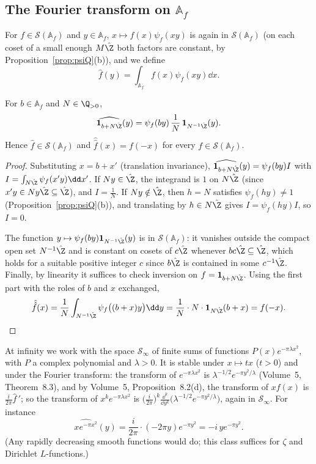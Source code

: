 \subsection*{The Fourier transform on \texorpdfstring{$\mathbb{A}_f$}{A\_f}}

For $f\in\mathcal S(\mathbb{A}_f)$ and $y\in\mathbb{A}_f$, $x\mapsto f(x)\psi_f(xy)$ is again in $\mathcal S(\mathbb{A}_f)$ (on each coset of a small enough $M\hat{\Z}$
both factors are constant, by Proposition~\ref{prop:psiQ}(b)), and we define
\[
\hat f(y)=\int_{\mathbb{A}_f}f(x)\psi_f(xy)\dd x.
\]

\begin{proposition}\label{prop:FTAf}
For $b\in\mathbb{A}_f$ and $N\in\Q_{>0}$,
\[
\widehat{\mathbf 1_{b+N\hat{\Z}}}(y)=\psi_f(by)\,\frac1N\,\mathbf 1_{N^{-1}\hat{\Z}}(y).
\]
Hence $\hat f\in\mathcal S(\mathbb{A}_f)$ and $\hat{\hat f}(x)=f(-x)$ for every $f\in\mathcal S(\mathbb{A}_f)$.
\end{proposition}
\begin{proof}
Substituting $x=b+x'$ (translation invariance), $\widehat{\mathbf 1_{b+N\hat{\Z}}}(y)=\psi_f(by)I$ with $I=\int_{N\hat{\Z}}\psi_f(x'y)\dd x'$. If
$Ny\in\hat{\Z}$, the integrand is $1$ on $N\hat{\Z}$ (since $x'y\in Ny\hat{\Z}\subseteq\hat{\Z}$), and $I=\frac1N$. If $Ny\notin\hat{\Z}$, then
$h=N$ satisfies $\psi_f(hy)\ne1$ (Proposition~\ref{prop:psiQ}(b)), and translating by $h\in N\hat{\Z}$ gives $I=\psi_f(hy)I$, so $I=0$.

The function $y\mapsto\psi_f(by)\mathbf 1_{N^{-1}\hat{\Z}}(y)$ is in $\mathcal S(\mathbb{A}_f)$: it vanishes outside the compact open set $N^{-1}\hat{\Z}$
and is constant on cosets of $c\hat{\Z}$ whenever $bc\hat{\Z}\subseteq\hat{\Z}$, which holds for a suitable positive integer $c$ since $b\hat{\Z}$ is
contained in some $c^{-1}\hat{\Z}$. Finally, by linearity it suffices to check inversion on $f=\mathbf 1_{b+N\hat{\Z}}$. Using the first part
with the roles of $b$ and $x$ exchanged,
\[
\hat{\hat f}(x)=\frac1N\int_{N^{-1}\hat{\Z}}\psi_f\bigl((b+x)y\bigr)\dd y=\frac1N\cdot N\cdot\mathbf 1_{N\hat{\Z}}(b+x)=f(-x).
\]
\end{proof}

At infinity we work with the space $\mathcal S_\infty$ of finite sums of functions $P(x)e^{-\pi\lambda x^2}$, with $P$ a complex polynomial
and $\lambda>0$. It is stable under $x\mapsto tx$ ($t>0$) and under the Fourier transform: the transform of $e^{-\pi\lambda x^2}$ is
$\lambda^{-1/2}e^{-\pi y^2/\lambda}$ (Volume~5, Theorem~8.3), and by Volume~5, Proposition~8.2(d), the transform of $xf(x)$ is $\frac i{2\pi}\hat f\,'$; so
the transform of $x^ke^{-\pi\lambda x^2}$ is $\bigl(\frac{i}{2\pi}\bigr)^k\frac{\dd^k}{\dd y^k}\bigl(\lambda^{-1/2}e^{-\pi y^2/\lambda}\bigr)$, again in
$\mathcal S_\infty$. For instance
\begin{equation}\label{eq:xgauss}
\widehat{xe^{-\pi x^2}}(y)=\frac{i}{2\pi}\cdot(-2\pi y)e^{-\pi y^2}=-i\,ye^{-\pi y^2}.
\end{equation}
(Any rapidly decreasing smooth functions would do; this class suffices for $\zeta$ and Dirichlet $L$-functions.)

